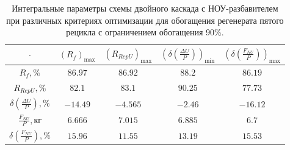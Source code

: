 \begin{table}
    \begin{tabular}{ccccc}
    $\cdot$ & $(R_f)_\text{max}$ & $(R_{RepU})_\text{max}$ & $(\delta(\frac{\Delta U}{P}))_\text{min}$ & $(\delta(\frac{F_{NU}}{P}))_\text{max}$\\ \hline
    $R_f, \%$ & $86.97$ & $86.92$ & $88.2$ & $86.19$\\ \hline
    $R_{RepU}, \%$ & $82.1$ & $83.1$ & $90.25$ & $77.73$\\ \hline
    $\delta(\frac{\Delta U}{P}), \%$ & $-14.49$ & $-4.565$ & $-2.46$ & $-16.12$\\ \hline
    $\frac{F_{NU}}{P}, \text{кг}$ & $6.666$ & $7.015$ & $6.885$ & $6.7$\\ \hline
    $\delta(\frac{F_{NU}}{P}), \%$ & $15.96$ & $11.55$ & $13.19$ & $15.53$\\ \hline
\end{tabular}
\caption{Интегральные параметры схемы двойного каскада с НОУ-разбавителем при различных критериях оптимизации для обогащения регенерата пятого рецикла с ограничением обогащения 90\%.{\label{2opt5_90_int}}}
\end{table}

